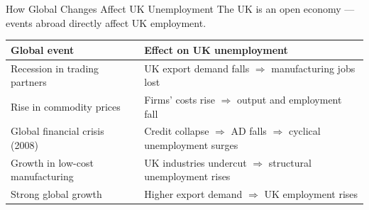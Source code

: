 \documentclass[16pt,aspectratio=169]{beamer}
\begin{document}
\begin{frame}{How Global Changes Affect UK Unemployment}
    The UK is an open economy --- events abroad directly affect UK employment.

    \vspace{0.3em}
    \begin{table}
        \centering
        \small
        \renewcommand{\arraystretch}{1.15}
        \begin{tabular}{@{}p{5.0cm}p{6.2cm}@{}}
            \toprule
            \textbf{Global event} & \textbf{Effect on UK unemployment} \\ \midrule
            Recession in trading partners & UK export demand falls $\Rightarrow$ manufacturing jobs lost \\
            Rise in commodity prices & Firms' costs rise $\Rightarrow$ output and employment fall \\
            Global financial crisis (2008) & Credit collapse $\Rightarrow$ AD falls $\Rightarrow$ cyclical unemployment surges \\
            Growth in low-cost manufacturing & UK industries undercut $\Rightarrow$ structural unemployment rises \\
            Strong global growth & Higher export demand $\Rightarrow$ UK employment rises \\ \bottomrule
        \end{tabular}
    \end{table}
\end{frame}
\end{document}
